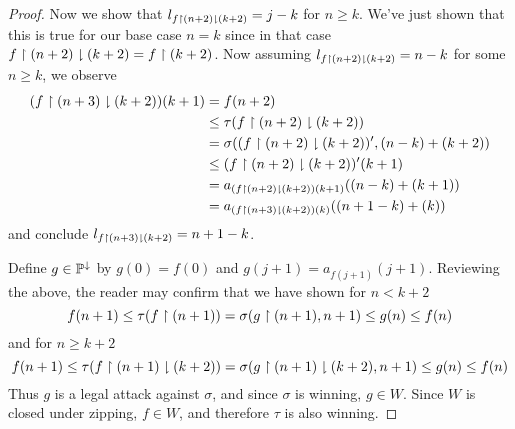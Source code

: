 \documentclass[11pt]{article}
\theoremstyle{plain}
\theoremstyle{definition}
\theoremstyle{remark}
\theoremstyle{plain}
\theoremstyle{definition}
\theoremstyle{remark}
\begin{document}
\begin{proof}
    Now we show that \(l_{f\restriction(n+2)\downharpoonright(k+2)}=j-k\) for \(n\geq k\).
    We've just shown that this is true for our base case \(n=k\)
    since in that case \(f\restriction(n+2)\downharpoonright(k+2)=f\restriction(k+2)\).
    Now assuming \(l_{f\restriction(n+2)\downharpoonright(k+2)}=n-k\) for some \(n\geq k\),
    we observe
    \begin{align*}
      (f\restriction(n+3)\downharpoonright(k+2))(k+1)
        &=
      f(n+2)
        \\&\leq
      \tau(f\restriction(n+2)\downharpoonright(k+2))
        \\&=
      \sigma((f\restriction(n+2)\downharpoonright(k+2))',(n-k)+(k+2))
        \\&\leq
      (f\restriction(n+2)\downharpoonright(k+2))'(k+1)
        \\&=
      a_{(f\restriction(n+2)\downharpoonright(k+2))(k+1)}((n-k)+(k+1))
        \\&=
      a_{(f\restriction(n+3)\downharpoonright(k+2))(k)}((n+1-k)+(k))
    \end{align*}
    and conclude \(l_{f\restriction(n+3)\downharpoonright(k+2)}=n+1-k\).

    Define \(g\in\mathbb{P}^\downarrow\) by \(g(0)=f(0)\) and
    \(g(j+1)=a_{f(j+1)}(j+1)\).
    Reviewing the above, the reader may confirm that we have shown for
    \(n<k+2\)
    \[
      f(n+1)
        \leq
      \tau(f\restriction(n+1))
        =
      \sigma(g\restriction(n+1),n+1)
        \leq
      g(n)
        \leq
      f(n)
    \]
    and for \(n\geq k+2\)
    \[
      f(n+1)
        \leq
      \tau(f\restriction(n+1)\downharpoonright(k+2))
        =
      \sigma(g\restriction(n+1)\downharpoonright(k+2),n+1)
        \leq
      g(n)
        \leq
      f(n)
    \]
    Thus \(g\) is a legal attack against \(\sigma\), and since \(\sigma\)
    is winning, \(g\in W\). Since \(W\) is closed under zipping,
    \(f\in W\), and therefore \(\tau\) is also winning.
  \end{proof}

  
  
\end{document}
